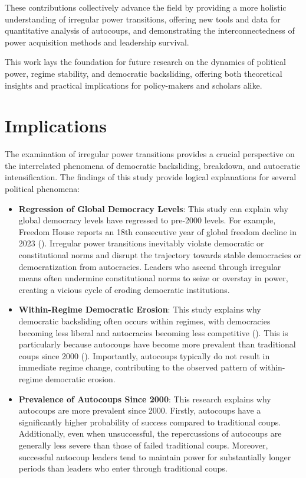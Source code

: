 \documentclass[
  12pt,
]{report}
\begin{document}
These contributions collectively advance the field by providing a more
holistic understanding of irregular power transitions, offering new
tools and data for quantitative analysis of autocoups, and demonstrating
the interconnectedness of power acquisition methods and leadership
survival.

This work lays the foundation for future research on the dynamics of
political power, regime stability, and democratic backsliding, offering
both theoretical insights and practical implications for policy-makers
and scholars alike.

\section{Implications}\label{implications}

The examination of irregular power transitions provides a crucial
perspective on the interrelated phenomena of democratic backsliding,
breakdown, and autocratic intensification. The findings of this study
provide logical explanations for several political phenomena:

\begin{itemize}
\item
  \textbf{Regression of Global Democracy Levels}: This study can explain
  why global democracy levels have regressed to pre-2000 levels. For
  example, Freedom House reports an 18th consecutive year of global
  freedom decline in 2023
  ().
  Irregular power transitions inevitably violate democratic or
  constitutional norms and disrupt the trajectory towards stable
  democracies or democratization from autocracies. Leaders who ascend
  through irregular means often undermine constitutional norms to seize
  or overstay in power, creating a vicious cycle of eroding democratic
  institutions.
\item
  \textbf{Within-Regime Democratic Erosion}: This study explains why
  democratic backsliding often occurs within regimes, with democracies
  becoming less liberal and autocracies becoming less competitive
  ().
  This is particularly because autocoups have become more prevalent than
  traditional coups since 2000 ().
  Importantly, autocoups typically do not result in immediate regime
  change, contributing to the observed pattern of within-regime
  democratic erosion.
\item
  \textbf{Prevalence of Autocoups Since 2000}: This research explains
  why autocoups are more prevalent since 2000. Firstly, autocoups have a
  significantly higher probability of success compared to traditional
  coups. Additionally, even when unsuccessful, the repercussions of
  autocoups are generally less severe than those of failed traditional
  coups. Moreover, successful autocoup leaders tend to maintain power
  for substantially longer periods than leaders who enter through
  traditional coups.
\end{itemize}
\end{document}
